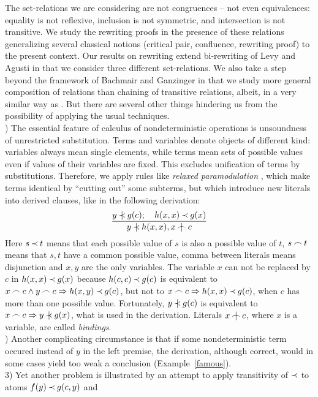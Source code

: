 The
set-relations we are considering are not congruences -- not even equivalences: 
equality is not reflexive, inclusion is  not symmetric,
 and intersection is not transitive. 
We study the rewriting proofs in the presence of these
relations generalizing several classical notions (critical pair, confluence,
rewriting proof) to the present context. Our results on rewriting extend
bi-rewriting of Levy and Agusti \cite{LA} in that we consider three different
set-relations. We also take a step beyond the framework of Bachmair and
Ganzinger \cite{BG249} in that we study more general composition of relations
than chaining of transitive relations, albeit, in a very similar way as \cite
{BG-Oslo}.  But there are several other things hindering us from the
possibility of applying the usual techniques. \\[1ex]
%
) 
The essential feature of calculus of nondeterministic operations is
unsoundness of unrestricted substitution. Terms and variables denote objects
of different kind: variables always mean single elements, while terms mean
sets of possible values even if values of their variables are fixed.  This
excludes unification of terms by substitutions.  Therefore, we apply rules
like {\em relaxed paramodulation} \cite {relaxed-par}, which make terms
identical by ``cutting out'' some subterms, but which introduce new literals
into derived clauses, like in the following derivation:
\[
\prule {y\notIncl g(c); \quad h(x,x)\Incl g(x)}{y\notIncl h(x,x), x\notInt c}
\] 
Here \(s\mathbin{\prec} t\) means that each possible value of $s$ is also a possible
value of $t$, \(s\mathbin{\frown} t\) means that $s,t$ have a common possible value,
comma between literals means disjunction and $x,y$ are the only variables.
The variable $x$ can not be replaced by $c$ in \(h(x,x)\mathbin{\prec} g(x)\) because
\(h(c,c)\mathbin{\prec} g(c)\) is equivalent to \(x\mathbin{\frown} c\land y\mathbin{\frown} c\mathrel\Rightarrow h(x,y)\mathbin{\prec}
g(c)\), but not to \(x\mathbin{\frown} c\mathrel\Rightarrow h(x,x)\mathbin{\prec} g(c)\), when $c$ has more than
one possible value.  Fortunately, \(y\notIncl g(c)\) is equivalent to \(x\Int
c\then y\notIncl g(x)\), what is used in the derivation.  Literals 
\(x\notInt c\), where $x$ is a variable, are called {\em bindings}.\\[1ex]
%
) 
Another complicating circumstance is that
if some nondeterministic term occured instead of $y$ in the left premise,
the derivation, although  correct, would in some cases yield too weak a 
conclusion (Example~\ref {famous}).  \\[1ex]
3) Yet another problem is illustrated by
an attempt to apply transitivity of $\mathbin{\prec}$ to atoms \(f(y)\mathbin{\prec} g(c,y)\) and
